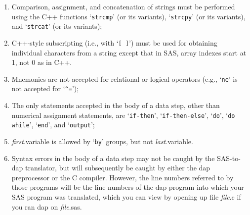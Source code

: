 \documentclass{book}
\newcommand\Texinfocommandstyletextvar[1]{{\normalfont{}\textsl{#1}}}%
\renewcommand{\_}{\Texinfounderscore\discretionary{}{}{}}
\begin{document}
\begin{enumerate}[start=1]
\item Comparison, assignment, and concatenation of strings must be performed
using the C++ functions `\texttt{strcmp}' (or its variants),
`\texttt{strcpy}' (or its variants), and `\texttt{strcat}' (or its variants);

\item C++-style subscripting (i.e., with `\texttt{[ ]}') must be used for obtaining
individual characters from a string except that in SAS, array indexes start at
1, not 0 as in C++.

\item Mnemonics are not accepted for relational or logical operators (e.g., `\texttt{ne}'
is not accepted for `\texttt{\^{}=}');

\item The only statements accepted in the body of a data step, other than numerical
assignment statements, are `\texttt{if-then}', `\texttt{if-then-else}',
`\texttt{do}', `\texttt{do while}', `\texttt{end}', and `\texttt{output}';

\item \Texinfocommandstyletextvar{first}.variable is allowed by `\texttt{by}' groups, but not \Texinfocommandstyletextvar{last}.variable.

\item Syntax errors in the body of a data step may not be caught by the SAS-to-dap
translator, but will subsequently be caught by either the dap preprocessor
or the C compiler. However, the line numbers referred to by those programs will
be the line numbers of the dap program into which your SAS program was translated,
which you can view by opening up file \Texinfocommandstyletextvar{file}.c if you ran dap on \Texinfocommandstyletextvar{file}.sas.

\end{enumerate}

%
\end{document}

